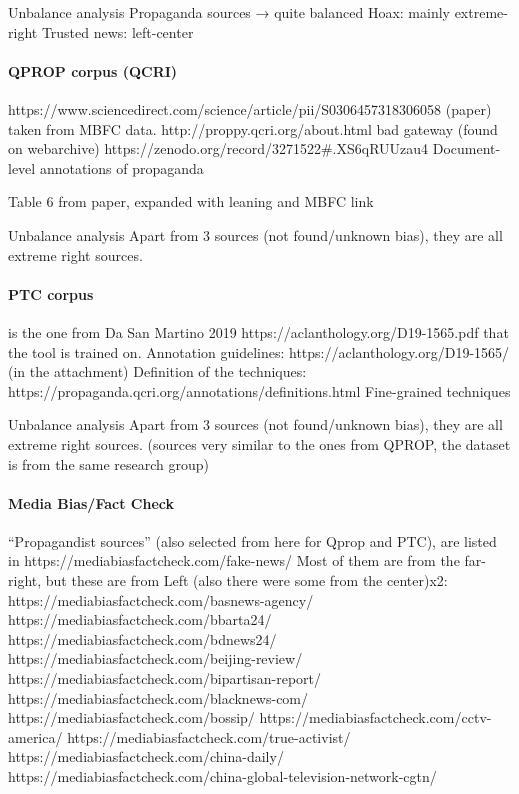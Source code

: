 Unbalance analysis
Propaganda sources → quite balanced
Hoax: mainly extreme-right
Trusted news: left-center

\paragraph{QPROP corpus (QCRI)}

https://www.sciencedirect.com/science/article/pii/S0306457318306058 (paper)
taken from MBFC data. http://proppy.qcri.org/about.html bad gateway (found on webarchive)
https://zenodo.org/record/3271522\#.XS6qRUUzau4 
Document-level annotations of propaganda

Table 6 from paper, expanded with leaning and MBFC link


Unbalance analysis
Apart from 3 sources (not found/unknown bias), they are all extreme right sources.

\paragraph{PTC corpus}
is the one from Da San Martino 2019 https://aclanthology.org/D19-1565.pdf that the tool is trained on.
Annotation guidelines: https://aclanthology.org/D19-1565/ (in the attachment)
Definition of the techniques: https://propaganda.qcri.org/annotations/definitions.html 
Fine-grained techniques

Unbalance analysis
Apart from 3 sources (not found/unknown bias), they are all extreme right sources. (sources very similar to the ones from QPROP, the dataset is from the same research group)

\paragraph{Media Bias/Fact Check}
“Propagandist sources” (also selected from here for Qprop and PTC), are listed in https://mediabiasfactcheck.com/fake-news/ 
Most of them are from the far-right, but these are from Left (also there were some from the center)x2:
https://mediabiasfactcheck.com/basnews-agency/
https://mediabiasfactcheck.com/bbarta24/
https://mediabiasfactcheck.com/bdnews24/ 
https://mediabiasfactcheck.com/beijing-review/
https://mediabiasfactcheck.com/bipartisan-report/
https://mediabiasfactcheck.com/blacknews-com/
https://mediabiasfactcheck.com/bossip/
https://mediabiasfactcheck.com/cctv-america/
https://mediabiasfactcheck.com/true-activist/
https://mediabiasfactcheck.com/china-daily/
https://mediabiasfactcheck.com/china-global-television-network-cgtn/



